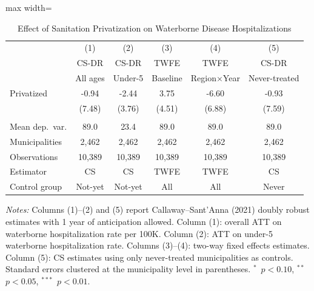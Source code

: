 \begin{table}[H]
\centering
\caption{Effect of Sanitation Privatization on Waterborne Disease Hospitalizations}
\label{tab:main}
\begin{threeparttable}
\begin{adjustbox}{max width=\textwidth}
\begin{tabular}{lccccc}
\toprule
 & (1) & (2) & (3) & (4) & (5) \\
 & CS-DR & CS-DR & TWFE & TWFE & CS-DR \\
 & All ages & Under-5 & Baseline & Region$\times$Year & Never-treated \\
\midrule
  Privatized & -0.94 & -2.44 & 3.75 & -6.60 & -0.93 \\
  & (7.48) & (3.76) & (4.51) & (6.88) & (7.59) \\
\\
  Mean dep.\ var. & 89.0 & 23.4 & 89.0 & 89.0 & 89.0 \\
  Municipalities & 2,462 & 2,462 & 2,462 & 2,462 & 2,462 \\
  Observations & 10,389 & 10,389 & 10,389 & 10,389 & 10,389 \\
  Estimator & CS & CS & TWFE & TWFE & CS \\
  Control group & Not-yet & Not-yet & All & All & Never \\
\bottomrule
\end{tabular}
\end{adjustbox}
\begin{tablenotes}[flushleft]
\small
\item \textit{Notes:} Columns (1)--(2) and (5) report Callaway--Sant'Anna (2021) doubly robust estimates with 1 year of anticipation allowed. Column (1): overall ATT on waterborne hospitalization rate per 100K. Column (2): ATT on under-5 waterborne hospitalization rate. Columns (3)--(4): two-way fixed effects estimates. Column (5): CS estimates using only never-treated municipalities as controls. Standard errors clustered at the municipality level in parentheses. $^{*}$~$p<0.10$, $^{**}$~$p<0.05$, $^{***}$~$p<0.01$.
\end{tablenotes}
\end{threeparttable}
\end{table}
